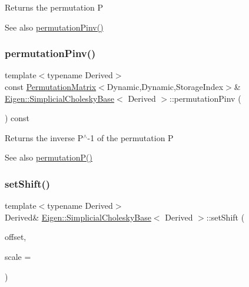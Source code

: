 \begin{DoxyReturn}{Returns}
the permutation P 
\end{DoxyReturn}
\begin{DoxySeeAlso}{See also}
\mbox{\hyperlink{class_eigen_1_1_simplicial_cholesky_base_a0e23d1f4a88c211be7098faf1cb41674}{permutation\+Pinv()}} 
\end{DoxySeeAlso}
\mbox{\label{class_eigen_1_1_simplicial_cholesky_base_a0e23d1f4a88c211be7098faf1cb41674}} 
\subsubsection{\texorpdfstring{permutationPinv()}{permutationPinv()}}
{\footnotesize\ttfamily template$<$typename Derived$>$ \\
const \mbox{\hyperlink{class_eigen_1_1_permutation_matrix}{Permutation\+Matrix}}$<$Dynamic,Dynamic,Storage\+Index$>$\& \mbox{\hyperlink{class_eigen_1_1_simplicial_cholesky_base}{Eigen\+::\+Simplicial\+Cholesky\+Base}}$<$ Derived $>$\+::permutation\+Pinv (\begin{DoxyParamCaption}{ }\end{DoxyParamCaption}) const\hspace{0.3cm}{\ttfamily [inline]}}

\begin{DoxyReturn}{Returns}
the inverse P$^\wedge$-\/1 of the permutation P 
\end{DoxyReturn}
\begin{DoxySeeAlso}{See also}
\mbox{\hyperlink{class_eigen_1_1_simplicial_cholesky_base_aff1480e595a21726beaec9a586a94d5a}{permutation\+P()}} 
\end{DoxySeeAlso}
\mbox{\label{class_eigen_1_1_simplicial_cholesky_base_a362352f755101faaac59c1ed9d5e3559}} 
\subsubsection{\texorpdfstring{setShift()}{setShift()}}
{\footnotesize\ttfamily template$<$typename Derived$>$ \\
Derived\& \mbox{\hyperlink{class_eigen_1_1_simplicial_cholesky_base}{Eigen\+::\+Simplicial\+Cholesky\+Base}}$<$ Derived $>$\+::set\+Shift (\begin{DoxyParamCaption}\item[{const Real\+Scalar \&}]{offset,  }\item[{const Real\+Scalar \&}]{scale = {} }\end{DoxyParamCaption})\hspace{0.3cm}{\ttfamily [inline]}}

